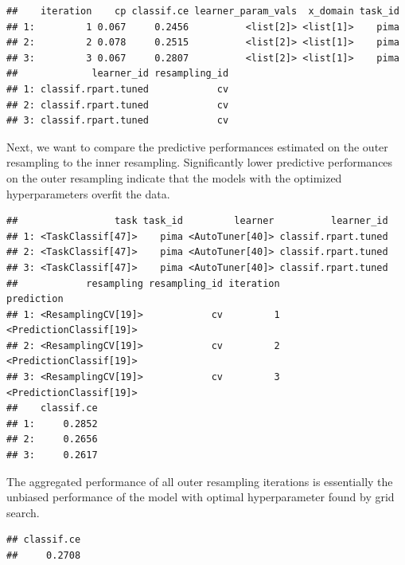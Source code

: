 \documentclass[
]{scrbook}
\newenvironment{Shaded}{\begin{snugshade}}{\end{snugshade}}
\newcommand{\FunctionTok}[1]{\textcolor[rgb]{0.00,0.00,0.00}{#1}}
\newcommand{\NormalTok}[1]{#1}
\newcommand{\SpecialCharTok}[1]{\textcolor[rgb]{0.00,0.00,0.00}{#1}}
\renewenvironment{Shaded} {\begin{snugshade}\small} {\end{snugshade}}
\begin{document}
\begin{verbatim}
##    iteration    cp classif.ce learner_param_vals  x_domain task_id
## 1:         1 0.067     0.2456          <list[2]> <list[1]>    pima
## 2:         2 0.078     0.2515          <list[2]> <list[1]>    pima
## 3:         3 0.067     0.2807          <list[2]> <list[1]>    pima
##             learner_id resampling_id
## 1: classif.rpart.tuned            cv
## 2: classif.rpart.tuned            cv
## 3: classif.rpart.tuned            cv
\end{verbatim}

Next, we want to compare the predictive performances estimated on the outer resampling to the inner resampling.
Significantly lower predictive performances on the outer resampling indicate that the models with the optimized hyperparameters overfit the data.

\begin{Shaded}
\end{Shaded}

\begin{verbatim}
##                 task task_id         learner          learner_id
## 1: <TaskClassif[47]>    pima <AutoTuner[40]> classif.rpart.tuned
## 2: <TaskClassif[47]>    pima <AutoTuner[40]> classif.rpart.tuned
## 3: <TaskClassif[47]>    pima <AutoTuner[40]> classif.rpart.tuned
##            resampling resampling_id iteration              prediction
## 1: <ResamplingCV[19]>            cv         1 <PredictionClassif[19]>
## 2: <ResamplingCV[19]>            cv         2 <PredictionClassif[19]>
## 3: <ResamplingCV[19]>            cv         3 <PredictionClassif[19]>
##    classif.ce
## 1:     0.2852
## 2:     0.2656
## 3:     0.2617
\end{verbatim}

The aggregated performance of all outer resampling iterations is essentially the unbiased performance of the model with optimal hyperparameter found by grid search.

\begin{Shaded}
\end{Shaded}

\begin{verbatim}
## classif.ce 
##     0.2708
\end{verbatim}
\end{document}
